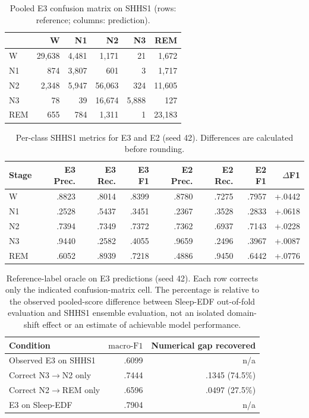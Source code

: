 \documentclass[10pt,a4paper]{article}
\newcommand{\mf}{\ensuremath{\mathrm{macro\text{-}F1}}}
\begin{document}
\begin{table}[H]
\centering\small
\caption{Pooled E3 confusion matrix on SHHS1 (rows: reference; columns: prediction).}
\label{tab:sup_shhs_confusion}
\begin{tabular}{lrrrrr}
\toprule
 & W & N1 & N2 & N3 & REM \\
\midrule
W & 29{,}638 & 4{,}481 & 1{,}171 & 21 & 1{,}672 \\
N1 & 874 & 3{,}807 & 601 & 3 & 1{,}717 \\
N2 & 2{,}348 & 5{,}947 & 56{,}063 & 324 & 11{,}605 \\
N3 & 78 & 39 & 16{,}674 & 5{,}888 & 127 \\
REM & 655 & 784 & 1{,}311 & 1 & 23{,}183 \\
\bottomrule
\end{tabular}
\end{table}

\begin{table}[H]
\centering\small
\caption{Per-class SHHS1 metrics for E3 and E2 (seed 42).
Differences are calculated before rounding.}
\label{tab:sup_shhs_e3_e2_perclass}
\begin{tabular}{lrrrrrrr}
\toprule
Stage & E3 Prec. & E3 Rec. & E3 F1 & E2 Prec. & E2 Rec. & E2 F1 & $\Delta$F1 \\
\midrule
W & .8823 & .8014 & .8399 & .8780 & .7275 & .7957 & +.0442 \\
N1 & .2528 & .5437 & .3451 & .2367 & .3528 & .2833 & +.0618 \\
N2 & .7394 & .7349 & .7372 & .7362 & .6937 & .7143 & +.0228 \\
N3 & .9440 & .2582 & .4055 & .9659 & .2496 & .3967 & +.0087 \\
REM & .6052 & .8939 & .7218 & .4886 & .9450 & .6442 & +.0776 \\
\bottomrule
\end{tabular}
\end{table}

\begin{table}[H]
\centering\small
\caption{Reference-label oracle on E3 predictions (seed 42). Each row corrects only the indicated
confusion-matrix cell. The percentage is relative to the observed pooled-score difference between
Sleep-EDF out-of-fold evaluation and SHHS1 ensemble evaluation, not an isolated domain-shift effect
or an estimate of achievable model performance.}
\label{tab:sup_oracle}
\begin{tabular}{lrr}
\toprule
Condition & \mf & Numerical gap recovered \\
\midrule
Observed E3 on SHHS1 & .6099 & n/a \\
Correct N3$\rightarrow$N2 only & .7444 & .1345 (74.5\%) \\
Correct N2$\rightarrow$REM only & .6596 & .0497 (27.5\%) \\
E3 on Sleep-EDF & .7904 & n/a \\
\bottomrule
\end{tabular}
\end{table}
\end{document}
